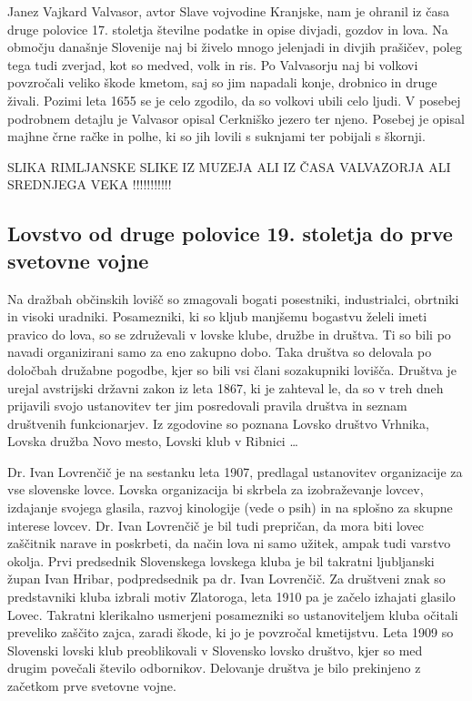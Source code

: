\documentclass[a4paper,12pt,openright]{book}
\begin{document}
Janez Vajkard Valvasor, avtor Slave vojvodine Kranjske, nam je ohranil iz časa druge polovice 17. stoletja številne podatke in opise divjadi, gozdov in lova. 
Na območju današnje Slovenije naj bi živelo mnogo jelenjadi in divjih prašičev, poleg tega tudi zverjad, kot so medved, volk in ris. Po Valvasorju naj bi volkovi povzročali veliko škode kmetom, saj so jim napadali konje, drobnico in druge živali. 
Pozimi leta 1655 se je celo zgodilo, da so volkovi ubili celo ljudi. V posebej podrobnem detajlu je Valvasor opisal Cerkniško jezero ter njeno. 
Posebej je opisal  majhne črne račke in polhe, ki so jih lovili s suknjami ter pobijali s škornji.

SLIKA RIMLJANSKE SLIKE IZ MUZEJA ALI IZ ČASA VALVAZORJA ALI SREDNJEGA VEKA !!!!!!!!!!!

\subsection{Lovstvo od druge polovice 19. stoletja do prve svetovne vojne}

Na dražbah občinskih lovišč so zmagovali bogati posestniki, industrialci, obrtniki in visoki uradniki. 
Posamezniki, ki so kljub manjšemu bogastvu želeli imeti pravico do lova, so se združevali v lovske klube, družbe in društva. 
Ti so bili po navadi organizirani samo za eno zakupno dobo. 
Taka društva so delovala po določbah družabne pogodbe, kjer so bili vsi člani sozakupniki lovišča. 
Društva je urejal avstrijski državni zakon iz leta 1867, ki je zahteval le, da so v treh dneh prijavili svojo ustanovitev ter jim posredovali pravila društva in seznam društvenih funkcionarjev. 
Iz zgodovine so poznana Lovsko društvo Vrhnika, Lovska družba Novo mesto, Lovski klub v Ribnici …

Dr. Ivan Lovrenčič je na sestanku leta 1907, predlagal ustanovitev organizacije za vse slovenske lovce. 
Lovska organizacija bi skrbela za izobraževanje lovcev, izdajanje svojega glasila, razvoj kinologije (vede o psih) in na splošno za skupne interese lovcev. 
Dr. Ivan Lovrenčič je bil tudi prepričan, da mora biti lovec zaščitnik narave in poskrbeti, da način lova ni samo užitek, ampak tudi varstvo okolja. 
Prvi predsednik Slovenskega lovskega kluba je bil takratni ljubljanski župan Ivan Hribar, podpredsednik pa dr. Ivan Lovrenčič. 
Za društveni znak so predstavniki kluba izbrali motiv Zlatoroga, leta 1910 pa je začelo izhajati glasilo Lovec. 
Takratni klerikalno usmerjeni posamezniki so ustanoviteljem kluba očitali preveliko zaščito zajca, zaradi škode, ki jo je povzročal kmetijstvu. 
Leta 1909 so Slovenski lovski klub preoblikovali v Slovensko lovsko društvo, kjer so med drugim povečali število odbornikov. 
Delovanje društva je bilo prekinjeno z začetkom prve svetovne vojne.
\end{document}
